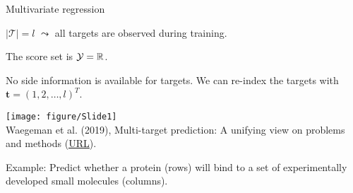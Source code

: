 \documentclass[11pt,compress,t,notes=noshow, xcolor=table]{beamer}
\newcommand{\Tspace}{\mathcal{T}}
\newcommand{\tv}{\mathbf{t}}
\begin{document}
\begin{frame}{Multivariate regression}
	\small
%		
		\begin{enumerate}\small
%			
			\item $|\Tspace|=l$ $\leadsto$ all targets are observed during training. 
	
			\begin{minipage}{0.45\textwidth}    
			
    			\item The score set is $\mathcal{Y} = \mathbb{R}$. 
                \vspace{10pt}
    
                \item No side information is available for targets. We can re-index the targets with $\tv = (1, 2, \ldots, l)^T$. 
            \end{minipage}
            \hfill
			\begin{minipage}{0.45\textwidth}    
				\begin{center} 	
				\texttt{[image: figure/Slide1]} 	\tiny
				\\ Waegeman et al. (2019), Multi-target prediction:
				A unifying view on problems and methods (\href{https://arxiv.org/pdf/1809.02352.pdf}{\underline{URL}}).
  	
				\end{center}
			\end{minipage}
		\end{enumerate}
  
    \vspace{10pt}
	Example: Predict whether a protein (rows) will bind to a set of experimentally developed small molecules (columns).
%
\end{frame}
\end{document}
